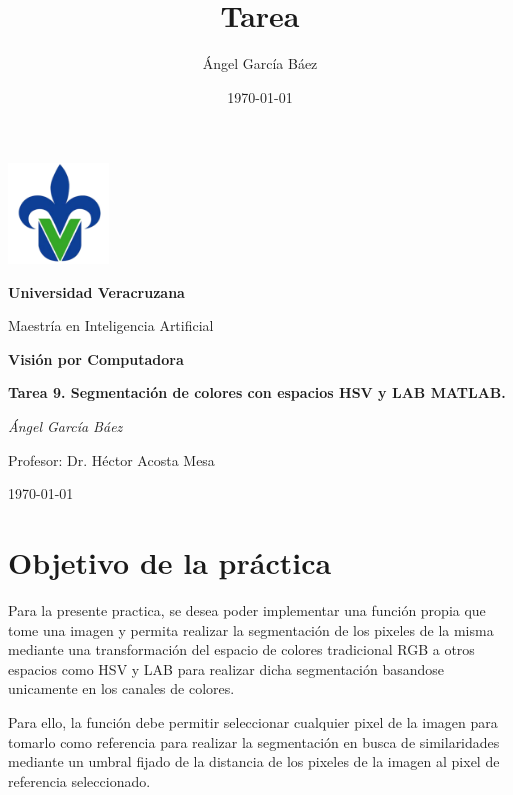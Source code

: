 \documentclass[11pt, letterpaper]{article}
\title{\bfseries Tarea}
\author{Ángel García Báez}
\date{\today}
\begin{document}
	
	\begin{titlepage}
		\centering
		\includegraphics[width=0.2\textwidth]{logo.png}\par
		\vspace{1cm}
		{\LARGE \bfseries Universidad Veracruzana \par}
		\vspace{1cm}
		{\Large Maestría en Inteligencia Artificial\par}
		\vspace{3cm}
		{\LARGE \bfseries Visión por Computadora \par}
		\vspace{1cm}
		{\Large \bfseries Tarea 9. Segmentación de colores con espacios HSV y LAB MATLAB. \par}
		\vfill
		{\Large \textit{Ángel García Báez}\par}
		\vspace{1cm}
		{\Large Profesor: Dr. Héctor Acosta Mesa \par}
		\vfill
		{\Large \today \par}
	\end{titlepage}
	
	\newpage
	\tableofcontents
	\newpage
	
\section{Objetivo de la práctica}

Para la presente practica, se desea poder implementar una función propia que tome una imagen y permita realizar la segmentación de los pixeles de la misma mediante una transformación del espacio de colores tradicional RGB a otros espacios como HSV y LAB para realizar dicha segmentación basandose unicamente en los canales de colores.

Para ello, la función debe permitir seleccionar cualquier pixel de la imagen para tomarlo como referencia para realizar la segmentación en busca de similaridades mediante un umbral fijado de la distancia de los pixeles de la imagen al pixel de referencia seleccionado.
\end{document}
